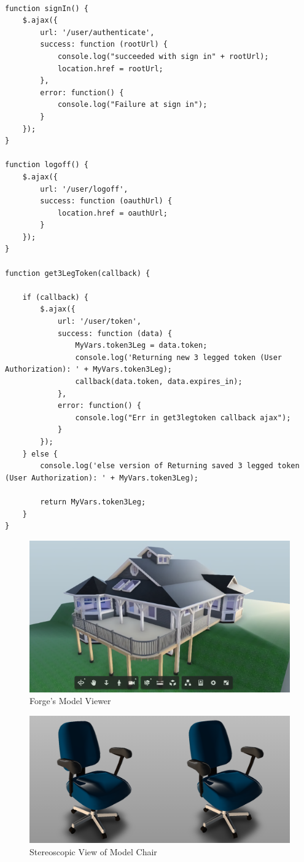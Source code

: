 \documentclass[10pt,draftclsnofoot,onecolumn]{IEEEtran}
\begin{document}
\begin{lstlisting}[caption=Login related functions]

function signIn() {
    $.ajax({
        url: '/user/authenticate',
        success: function (rootUrl) {
            console.log("succeeded with sign in" + rootUrl);
            location.href = rootUrl;
        },
        error: function() {
            console.log("Failure at sign in");
        }
    });
}

function logoff() {
    $.ajax({
        url: '/user/logoff',
        success: function (oauthUrl) {
            location.href = oauthUrl;
        }
    });
}

function get3LegToken(callback) {

    if (callback) {
        $.ajax({
            url: '/user/token',
            success: function (data) {
                MyVars.token3Leg = data.token;
                console.log('Returning new 3 legged token (User Authorization): ' + MyVars.token3Leg);
                callback(data.token, data.expires_in);
            },
            error: function() {
                console.log("Err in get3legtoken callback ajax");
            }
        });
    } else {
        console.log('else version of Returning saved 3 legged token (User Authorization): ' + MyVars.token3Leg);

        return MyVars.token3Leg;
    }
}
\end{lstlisting}

\begin{figure}[ht]
	\includegraphics[scale=0.9]{modelviewer.png}
	\caption{Forge's Model Viewer}
\end{figure}
\begin{figure}[ht]
	\includegraphics[scale=0.3]{project.png}
	\caption{Stereoscopic View of Model Chair}
\end{figure}
\end{document}
